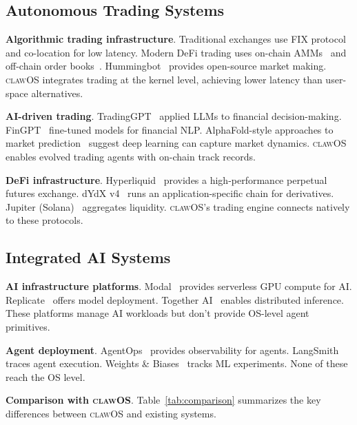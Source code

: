 \documentclass{article}
\newcommand{\clawos}{\textsc{clawOS}}
\begin{document}
\subsection{Autonomous Trading Systems}

\textbf{Algorithmic trading infrastructure}. Traditional exchanges use FIX protocol~\cite{fix2024} and co-location for low latency. Modern DeFi trading uses on-chain AMMs~\cite{adams2021uniswap} and off-chain order books~\cite{hyperliquid2024, dydx2024}. Hummingbot~\cite{hummingbot2024} provides open-source market making. \clawos{} integrates trading at the kernel level, achieving lower latency than user-space alternatives.

\textbf{AI-driven trading}. TradingGPT~\cite{li2023tradinggpt} applied LLMs to financial decision-making. FinGPT~\cite{yang2023fingpt} fine-tuned models for financial NLP. AlphaFold-style approaches to market prediction~\cite{zhang2024alphafin} suggest deep learning can capture market dynamics. \clawos{} enables evolved trading agents with on-chain track records.

\textbf{DeFi infrastructure}. Hyperliquid~\cite{hyperliquid2024} provides a high-performance perpetual futures exchange. dYdX v4~\cite{dydx2024} runs an application-specific chain for derivatives. Jupiter (Solana)~\cite{jupiter2024} aggregates liquidity. \clawos{}'s trading engine connects natively to these protocols.

\subsection{Integrated AI Systems}

\textbf{AI infrastructure platforms}. Modal~\cite{modal2024} provides serverless GPU compute for AI. Replicate~\cite{replicate2024} offers model deployment. Together AI~\cite{together2024} enables distributed inference. These platforms manage AI workloads but don't provide OS-level agent primitives.

\textbf{Agent deployment}. AgentOps~\cite{agentops2024} provides observability for agents. LangSmith~\cite{langsmith2024} traces agent execution. Weights \& Biases~\cite{wandb2024} tracks ML experiments. None of these reach the OS level.

\textbf{Comparison with \clawos{}}. Table~\ref{tab:comparison} summarizes the key differences between \clawos{} and existing systems.
\end{document}
